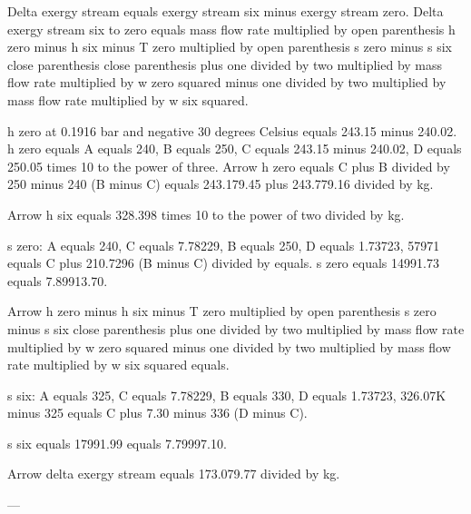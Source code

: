 Delta exergy stream equals exergy stream six minus exergy stream zero.  
Delta exergy stream six to zero equals mass flow rate multiplied by open parenthesis h zero minus h six minus T zero multiplied by open parenthesis s zero minus s six close parenthesis close parenthesis plus one divided by two multiplied by mass flow rate multiplied by w zero squared minus one divided by two multiplied by mass flow rate multiplied by w six squared.  

h zero at 0.1916 bar and negative 30 degrees Celsius equals 243.15 minus 240.02.  
h zero equals A equals 240, B equals 250, C equals 243.15 minus 240.02, D equals 250.05 times 10 to the power of three.  
Arrow h zero equals C plus B divided by 250 minus 240 (B minus C) equals 243.179.45 plus 243.779.16 divided by kg.  

Arrow h six equals 328.398 times 10 to the power of two divided by kg.  

s zero:  
A equals 240, C equals 7.78229, B equals 250, D equals 1.73723, 57971 equals C plus 210.7296 (B minus C) divided by equals.  
s zero equals 14991.73 equals 7.89913.70.  

Arrow h zero minus h six minus T zero multiplied by open parenthesis s zero minus s six close parenthesis plus one divided by two multiplied by mass flow rate multiplied by w zero squared minus one divided by two multiplied by mass flow rate multiplied by w six squared equals.  

s six:  
A equals 325, C equals 7.78229, B equals 330, D equals 1.73723, 326.07K minus 325 equals C plus 7.30 minus 336 (D minus C).  

s six equals 17991.99 equals 7.79997.10.  

Arrow delta exergy stream equals 173.079.77 divided by kg.  

---